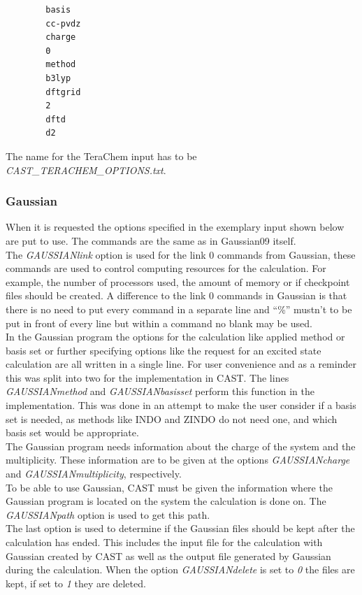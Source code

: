 \documentclass[10pt,a4paper]{article} %
\begin{document}
		\begin{lstlisting}
		basis
		cc-pvdz
		charge
		0
		method
		b3lyp
		dftgrid
		2
		dftd
		d2\end{lstlisting}

		The name for the TeraChem input has to be \glqq \textit{CAST\_TERACHEM\_OPTIONS.txt}\grqq.
			
			\subsubsection{Gaussian}
 When it is requested the options specified in the exemplary input shown below are put to use. The commands are the same as in Gaussian09\supercite{M.J.Frisch2009} itself.\\
The \textit{GAUSSIANlink} option is used for the link 0 commands from Gaussian, these commands are used to control computing resources for the calculation. For example, the number of processors used, the amount of memory or if checkpoint files should be created. A difference to the link 0 commands in Gaussian is that there is no need to put every command in a separate line and ``\%'' mustn't to be put in front of every line but within a command no blank may be used.\\
In the Gaussian program the options for the calculation like applied method or basis set or further specifying options like the request for an excited state calculation are all written in a single line. For user convenience and as a reminder this was split into two for the implementation in CAST. The lines \textit{GAUSSIANmethod} and \textit{GAUSSIANbasisset} perform this function in the implementation. This was done in an attempt to make the user consider if a basis set is needed, as methods like INDO\supercite{Pople1967} and ZINDO\supercite{Ridley1973,Ridley1976} do not need one, and which basis set would be appropriate.\\
The Gaussian program needs information about the charge of the system and the multiplicity. These information are to be given at the options \textit{GAUSSIANcharge} and \textit{GAUSSIANmultiplicity}, respectively.\\
To be able to use Gaussian, CAST must be given the information where the Gaussian program is located on the system the calculation is done on. The \textit{GAUSSIANpath} option is used to get this path.\\
The last option is used to determine if the Gaussian files should be kept after the calculation has ended. This includes the input file for the calculation with Gaussian created by CAST as well as the output file generated by Gaussian during the calculation. When the option \textit{GAUSSIANdelete} is set to \textit{0} the files are kept, if set to \textit{1} they are deleted.\\
\end{document}
